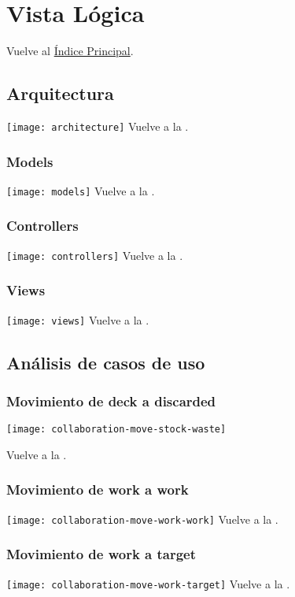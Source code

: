 \newpage{}
\section{Vista Lógica}\label{logictoc}

\secttoc
Vuelve al \hyperlink{toc}{Índice Principal}.

\newpage{}
\subsection{Arquitectura}
\texttt{[image: architecture]}
Vuelve a la .

\newpage{}
\subsubsection{Models}
\texttt{[image: models]}
Vuelve a la .

\newpage{}
\subsubsection{Controllers}
\texttt{[image: controllers]}
Vuelve a la .

\newpage{}
\subsubsection{Views}
\texttt{[image: views]}
Vuelve a la .

\newpage{}
\subsection{Análisis de casos de uso}

\subsubsection{Movimiento de deck a discarded}
\texttt{[image: collaboration-move-stock-waste]}

Vuelve a la .

\newpage{}
\subsubsection{Movimiento de work a work}
\texttt{[image: collaboration-move-work-work]}
Vuelve a la .

\newpage{}
\subsubsection{Movimiento de work a target}
\texttt{[image: collaboration-move-work-target]}
Vuelve a la .


